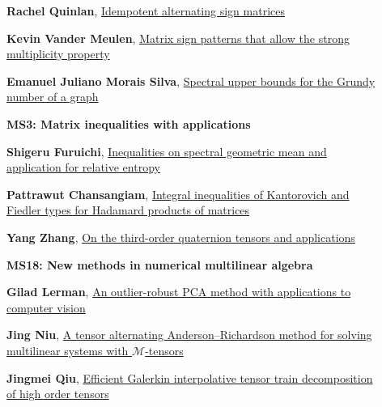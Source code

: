 \documentclass[ILAS2025-program.tex]{subfiles}
\begin{document}
\begin{description}
\begin{description}
    \item[] \hypertarget{up0141}{}\textbf{Rachel Quinlan}, \hyperlink{down0141}{Idempotent alternating sign matrices}
        \item[] \hypertarget{up0142}{}\textbf{Kevin Vander Meulen}, \hyperlink{down0142}{Matrix sign patterns that allow the strong multiplicity property}
        \item[] \hypertarget{up0143}{}\textbf{Emanuel Juliano Morais Silva}, \hyperlink{down0143}{Spectral upper bounds for the Grundy number of a graph}
        \end{description}
    \begin{description}
    \item[] {\color{mstitle}\textbf{MS3: Matrix inequalities with applications}} 
    \item[] \hypertarget{up0144}{}\textbf{Shigeru Furuichi}, \hyperlink{down0144}{Inequalities on spectral geometric mean and application for relative entropy}
        \item[] \hypertarget{up0145}{}\textbf{Pattrawut Chansangiam}, \hyperlink{down0145}{Integral inequalities of Kantorovich and Fiedler types for Hadamard products of matrices}
        \item[] \hypertarget{up0146}{}\textbf{Yang Zhang}, \hyperlink{down0146}{On the third-order quaternion tensors and applications
}
        \end{description}
    \begin{description}
    \item[] {\color{mstitle}\textbf{MS18: New methods in numerical multilinear algebra}} 
    \item[] \hypertarget{up0147}{}\textbf{Gilad Lerman}, \hyperlink{down0147}{An outlier-robust PCA method with applications to computer vision
}
        \item[] \hypertarget{up0148}{}\textbf{Jing Niu}, \hyperlink{down0148}{A tensor alternating Anderson--Richardson method for solving multilinear systems with $ \mathcal{M} $-tensors}
        \item[] \hypertarget{up0149}{}\textbf{Jingmei Qiu}, \hyperlink{down0149}{Efficient Galerkin interpolative tensor train decomposition of high order tensors
}
        \end{description}

\end{description}
\end{document}
